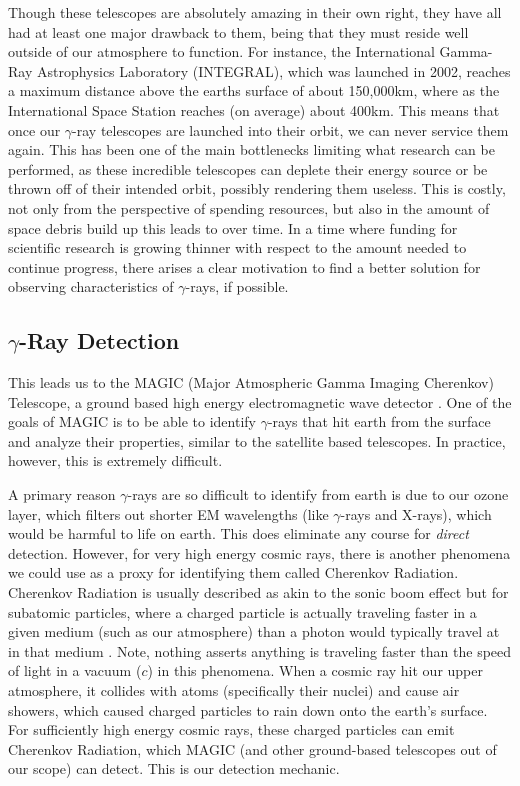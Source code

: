 \documentclass[12pt, a4paper]{article} %
\begin{document}
Though these telescopes are absolutely amazing in their own right, they have all had at least one major drawback to them, being that they must reside well outside of our atmosphere to function. For instance, the International Gamma-Ray Astrophysics Laboratory (INTEGRAL), which was launched in 2002, reaches a maximum distance above the earths surface of about 150,000km, where as the International Space Station reaches (on average) about 400km. This means that once our $\gamma$-ray telescopes are launched into their orbit, we can never service them again. This has been one of the main bottlenecks limiting what research can be performed, as these incredible telescopes can deplete their energy source or be thrown off of their intended orbit, possibly rendering them useless. This is costly, not only from the perspective of spending resources, but also in the amount of space debris build up this leads to over time. In a time where funding for scientific research is growing thinner with respect to the amount needed to continue progress, there arises a clear motivation to find a better solution for observing characteristics of $\gamma$-rays, if possible.

\subsection{$\gamma$-Ray Detection}

This leads us to the MAGIC (Major Atmospheric Gamma Imaging Cherenkov) Telescope, a ground based high energy electromagnetic wave detector \citep{MAGIC}. One of the goals of MAGIC is to be able to identify $\gamma$-rays that hit earth from the surface and analyze their properties, similar to the satellite based telescopes. In practice, however, this is extremely difficult. 

A primary reason $\gamma$-rays are so difficult to identify from earth is due to our ozone layer, which filters out shorter EM wavelengths (like $\gamma$-rays and X-rays), which would be harmful to life on earth. This does eliminate any course for \textit{direct} detection. However, for very high energy cosmic rays, there is another phenomena we could use as a proxy for identifying them called Cherenkov Radiation. Cherenkov Radiation is usually described as akin to the sonic boom effect but for subatomic particles, where a charged particle is actually traveling faster in a given medium (such as our atmosphere) than a photon would typically travel at in that medium \citep{CherenkovRad}. Note, nothing asserts anything is traveling faster than the speed of light in a vacuum ($c$) in this phenomena. When a cosmic ray hit our upper atmosphere, it collides with atoms (specifically their nuclei) and cause air showers, which caused charged particles to rain down onto the earth's surface. For sufficiently high energy cosmic rays, these charged particles can emit Cherenkov Radiation, which MAGIC (and other ground-based telescopes out of our scope) can detect. This is our detection mechanic.
\end{document}
